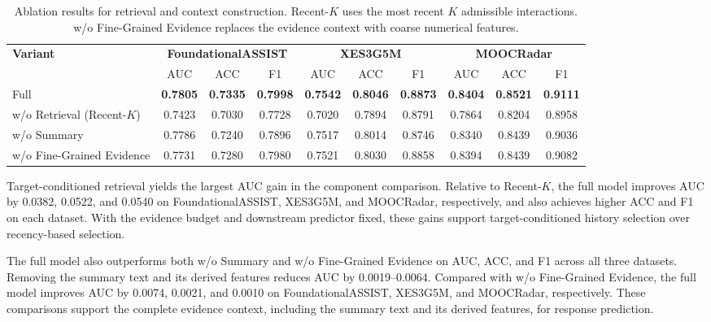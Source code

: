 \documentclass{llncs}
\begin{document}
\begin{table}[t]
\centering
\scriptsize
\setlength{\tabcolsep}{2.5pt}
\caption{Ablation results for retrieval and context construction. Recent-$K$ uses the most recent $K$ admissible interactions. w/o Fine-Grained Evidence replaces the evidence context with coarse numerical features.}
\label{tab:component-ablation}
\begin{tabular}{lccccccccc}
\toprule
\multirow{2}{*}{\textbf{Variant}}
& \multicolumn{3}{c}{\textbf{FoundationalASSIST}}
& \multicolumn{3}{c}{\textbf{XES3G5M}}
& \multicolumn{3}{c}{\textbf{MOOCRadar}} \\
\cmidrule(lr){2-4}
\cmidrule(lr){5-7}
\cmidrule(lr){8-10}
& AUC & ACC & F1
& AUC & ACC & F1
& AUC & ACC & F1 \\
\midrule
Full
& \textbf{0.7805} & \textbf{0.7335} & \textbf{0.7998}
& \textbf{0.7542} & \textbf{0.8046} & \textbf{0.8873}
& \textbf{0.8404} & \textbf{0.8521} & \textbf{0.9111} \\
w/o Retrieval (Recent-$K$)
& 0.7423 & 0.7030 & 0.7728
& 0.7020 & 0.7894 & 0.8791
& 0.7864 & 0.8204 & 0.8958 \\
w/o Summary
& 0.7786 & 0.7240 & 0.7896
& 0.7517 & 0.8014 & 0.8746
& 0.8340 & 0.8439 & 0.9036 \\
w/o Fine-Grained Evidence
& 0.7731 & 0.7280 & 0.7980
& 0.7521 & 0.8030 & 0.8858
& 0.8394 & 0.8439 & 0.9082 \\
\bottomrule
\end{tabular}
\end{table}

Target-conditioned retrieval yields the largest AUC gain in the component comparison. Relative to Recent-$K$, the full model improves AUC by 0.0382, 0.0522, and 0.0540 on FoundationalASSIST, XES3G5M, and MOOCRadar, respectively, and also achieves higher ACC and F1 on each dataset. With the evidence budget and downstream predictor fixed, these gains support target-conditioned history selection over recency-based selection.

The full model also outperforms both w/o Summary and w/o Fine-Grained Evidence on AUC, ACC, and F1 across all three datasets. Removing the summary text and its derived features reduces AUC by 0.0019--0.0064. Compared with w/o Fine-Grained Evidence, the full model improves AUC by 0.0074, 0.0021, and 0.0010 on FoundationalASSIST, XES3G5M, and MOOCRadar, respectively. These comparisons support the complete evidence context, including the summary text and its derived features, for response prediction.
\end{document}
